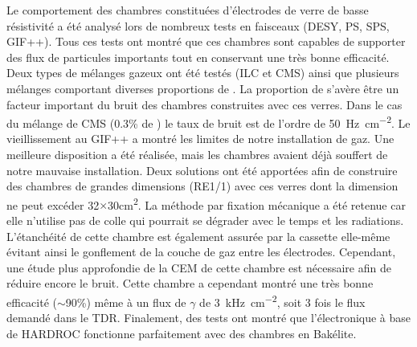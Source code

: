 Le comportement des chambres constituées d'électrodes de verre de basse résistivité a été analysé lors de nombreux tests en faisceaux (DESY, PS, SPS, GIF++). Tous ces tests ont montré que ces chambres sont capables de supporter des flux de particules importants tout en conservant une très bonne efficacité. Deux types de mélanges gazeux ont été testés (ILC et CMS) ainsi que plusieurs mélanges comportant diverses proportions de . La proportion de  s'avère être un facteur important du bruit des chambres construites avec ces verres. Dans le cas du mélange de CMS (\num{0.3}\% de ) le taux de bruit est de l'ordre de \SI{50}{\hertz\per\square\centi\meter}. Le vieillissement au GIF++ a montré les limites de notre installation de gaz. Une meilleure disposition a été réalisée, mais les chambres avaient déjà souffert de notre mauvaise installation. Deux solutions ont été apportées afin de construire des chambres de grandes dimensions (RE1/1) avec ces verres dont la dimension ne peut excéder \num{32}$\times$\num{30}\si{\square\centi\meter}. La méthode par fixation mécanique a été retenue car elle n'utilise pas de colle qui pourrait se dégrader avec le temps et les radiations. L'étanchéité de cette chambre est également assurée par la cassette elle-même évitant ainsi le gonflement de la couche de gaz entre les électrodes. Cependant, une étude plus approfondie de la CEM de cette chambre est nécessaire afin de réduire encore le bruit. Cette chambre a cependant montré une très bonne efficacité ($\sim$\num{90}\%) même à un flux de $\gamma$ de \SI{3}{\kilo\hertz\per\square\centi\meter}, soit \num{3} fois le flux demandé dans le TDR. Finalement, des tests ont montré que l'électronique à base de HARDROC fonctionne parfaitement avec des chambres en Bakélite.
